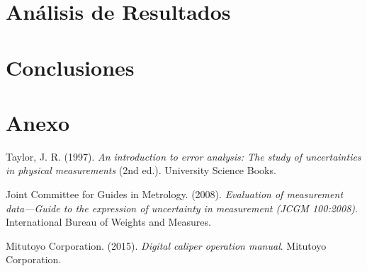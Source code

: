 \documentclass[11pt,twocolumn]{article}
\begin{document}
\section{Análisis de Resultados}

\section{Conclusiones}

\section{Anexo}

\begin{thebibliography}{9}

 Taylor, J. R. (1997). \textit{An introduction to error analysis: The study of uncertainties in physical measurements} (2nd ed.). University Science Books.

 Joint Committee for Guides in Metrology. (2008). \textit{Evaluation of measurement data—Guide to the expression of uncertainty in measurement (JCGM 100:2008)}. International Bureau of Weights and Measures.

 Mitutoyo Corporation. (2015). \textit{Digital caliper operation manual}. Mitutoyo Corporation.

\end{thebibliography}
\end{document}
